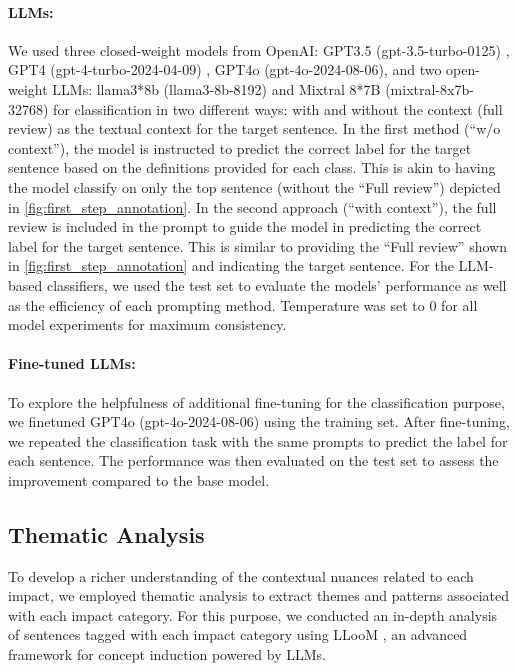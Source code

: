 \paragraph{LLMs: }
We used three closed-weight models from OpenAI: GPT3.5 (gpt-3.5-turbo-0125) \cite{openai2023chatgpt}, GPT4 (gpt-4-turbo-2024-04-09) \cite{openai2023gpt4}, GPT4o (gpt-4o-2024-08-06), and two open-weight LLMs: llama3*8b (llama3-8b-8192) \cite{llama3modelcard} and Mixtral 8*7B (mixtral-8x7b-32768) \cite{jiang2024mixtral} for classification in two different ways: with and without the context (full review) as the textual context for the target sentence.
In the first method (``w/o context''), the model is instructed to predict the correct label for the target sentence based on the definitions provided for each class. 
% 
This is akin to having the model classify on only the top sentence (without the ``Full review'') depicted in \autoref{fig:first_step_annotation}.
%
In the second approach (``with context''), the full review is included in the prompt to guide the model in predicting the correct label for the target sentence. This is similar to providing the ``Full review'' shown in \autoref{fig:first_step_annotation} and indicating the target sentence.
For the LLM-based classifiers, we used the test set to evaluate the models' performance as well as the efficiency of each prompting method.
Temperature was set to 0 for all model experiments for maximum consistency.  


\paragraph{Fine-tuned LLMs: }
To explore the helpfulness of additional fine-tuning for the classification purpose, we finetuned GPT4o (gpt-4o-2024-08-06) using the training set.
After fine-tuning, we repeated the classification task with the same prompts to predict the label for each sentence. The performance was then evaluated on the test set to assess the improvement compared to the base model. 


\subsection{Thematic Analysis}
To develop a richer understanding of the contextual nuances related to each impact, we employed thematic analysis to extract themes and patterns associated with each impact category. For this purpose, we conducted an in-depth analysis of sentences tagged with each impact category using LLooM \cite{lam2024concept}, an advanced framework for concept induction powered by LLMs.

